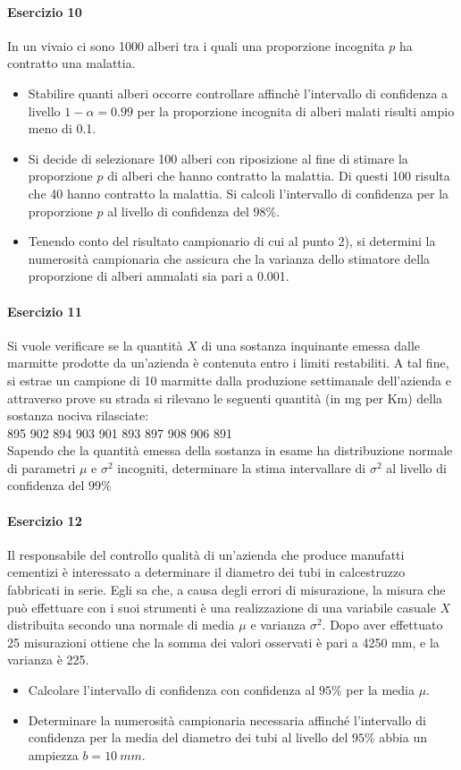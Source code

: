 \documentclass[12pt]{article}
\begin{document}
    \paragraph{Esercizio 10}
    In un vivaio ci sono 1000 alberi tra i quali una proporzione incognita $p$ ha contratto una malattia.
    \begin{itemize}
        \item Stabilire quanti alberi occorre controllare affinchè l'intervallo di confidenza a livello $1 - \alpha =0.99$ per la proporzione incognita di alberi malati risulti ampio meno di 0.1.
        \item Si decide di selezionare 100 alberi con riposizione al fine di stimare la proporzione $p$ di alberi che hanno contratto la malattia. Di questi 100 risulta che 40 hanno contratto la malattia. Si calcoli l’intervallo di confidenza per la proporzione $p$ al livello di confidenza del $98\%$.
        \item Tenendo conto del risultato campionario di cui al punto 2), si determini la numerosità campionaria che assicura che la varianza dello stimatore della proporzione di alberi ammalati sia pari a 0.001.
    \end{itemize}

    \paragraph{Esercizio 11}
    Si vuole verificare se la quantità $X$ di una sostanza inquinante emessa dalle marmitte prodotte da un’azienda è contenuta entro i limiti restabiliti. A tal fine, si estrae un campione di 10 marmitte dalla produzione settimanale dell’azienda e attraverso prove su strada si rilevano le seguenti quantità (in mg per Km) della sostanza nociva rilasciate:
    \\895 902 894 903 901 893 897 908 906 891
    \\Sapendo che la quantità emessa della sostanza in esame ha distribuzione normale di parametri $\mu$ e $\sigma^2$ incogniti, determinare la stima intervallare di $\sigma^2$ al livello di confidenza del $99\%$
    \newpage
    \paragraph{Esercizio 12}
    Il responsabile del controllo qualità di un’azienda che produce manufatti cementizi è interessato a determinare il diametro dei tubi in calcestruzzo fabbricati in serie. Egli sa che, a causa degli errori di misurazione, la misura che può effettuare con i suoi strumenti è una realizzazione di una variabile casuale $X$ distribuita secondo una normale di media $\mu$ e varianza $\sigma^2$. Dopo aver effettuato 25 misurazioni ottiene che la somma dei valori osservati è pari a 4250 mm, e la varianza è 225.
    \begin{itemize}
        \item Calcolare l’intervallo di confidenza con confidenza al $95\%$ per la media $\mu$.
        \item Determinare la numerosità campionaria necessaria affinché l’intervallo di confidenza per la media del diametro dei tubi al livello del $95\%$ abbia un ampiezza $b=10 \ mm$.
    \end{itemize}
    \newpage
\end{document}
